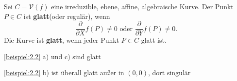 \begin{definition}
    Sei $C = \mathcal{V}(f)$ eine irreduzible, ebene, affine, algebraische Kurve. Der Punkt $P \in C$ ist
    \textbf{glatt}(oder regulär), wenn
    $$ \frac{\partial}{\partial X}f(P) \neq 0 \text{ oder } \frac{\partial}{\partial Y} f(P) \neq 0.$$
    Die Kurve ist \textbf{glatt}, wenn jeder Punkt $P \in C$ glatt ist.
\end{definition}

\begin{beispiel}
    \cref{beispiel:2.2} a) und c) sind glatt

    \cref{beispiel:2.2} b) ist überall glatt außer in $(0,0)$, dort singulär
\end{beispiel}